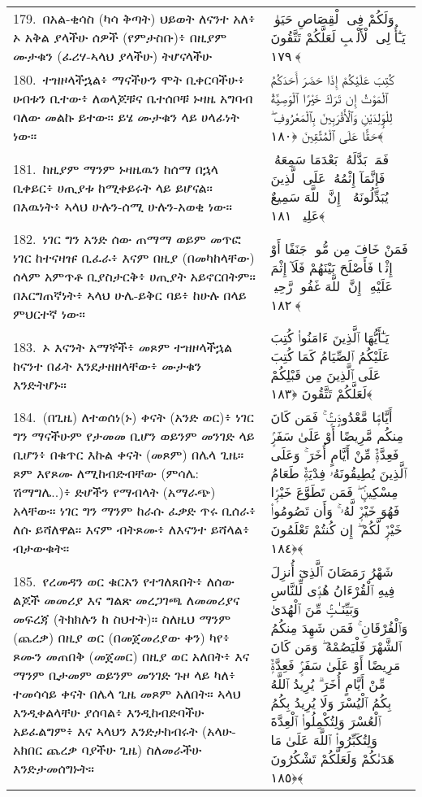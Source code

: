 \documentclass[11pt,a4paper,oneside]{article}%
\newcommand{\mytextarabic}[1]{\textarabic{ #1 \flushright}}
\begin{document}
\begin{longtable}{%
  @{}
    p{}
  @{~~~}
    p{}
    @{}
}
179.\ በአል-ቂሳስ (ካሳ ቅጣት) ህይወት ለናንተ አለ፥ ኦ አቅል ያላችሁ ሰዎች (የምታስቡ)፥ በዚያም ሙታቁን (ፈሪሃ-ኣላህ ያላችሁ) ትሆናላችሁ &  \mytextarabic{وَلَكُمْ فِى ٱلْقِصَاصِ حَيَوٰةٌۭ يَـٰٓأُو۟لِى ٱلْأَلْبَٟبِ لَعَلَّكُمْ تَتَّقُونَ ﴿١٧٩﴾}\\
180.\ ተዝዞላችኋል፥ ማናችሁን ሞት ቢቀርባችሁ፥ ሀብቱን ቢተው፥ ለወላጆቹና ቤተሰቦቹ ኑዛዜ አግባብ ባለው መልኩ ይተው። ይሄ ሙታቁን ላይ ሀላፊነት ነው። &  \mytextarabic{كُتِبَ عَلَيْكُمْ إِذَا حَضَرَ أَحَدَكُمُ ٱلْمَوْتُ إِن تَرَكَ خَيْرًا ٱلْوَصِيَّةُ لِلْوَٟلِدَيْنِ وَٱلْأَقْرَبِينَ بِٱلْمَعْرُوفِ ۖ حَقًّا عَلَى ٱلْمُتَّقِينَ ﴿١٨٠﴾}\\
181.\ ከዚያም ማንም ኑዛዜዉን ከሰማ በኋላ ቢቀይር፥ ሀጢያቱ ከሚቀይሩት ላይ ይሆናል። በእዉነት፥ ኣላህ ሁሉን-ሰሚ ሁሉን-አወቂ ነው። &  \mytextarabic{فَمَنۢ بَدَّلَهُۥ بَعْدَمَا سَمِعَهُۥ فَإِنَّمَآ إِثْمُهُۥ عَلَى ٱلَّذِينَ يُبَدِّلُونَهُۥٓ ۚ إِنَّ ٱللَّهَ سَمِيعٌ عَلِيمٌۭ ﴿١٨١﴾}\\
182.\ ነገር ግን አንድ ሰው ጠማማ ወይም መጥፎ ነገር ከተናዛዡ ቢፈራ፥ እናም በዚያ (በመካከላቸው) ሰላም አምጥቶ ቢያስታርቅ፥ ሀጢያት አይኖርበትም። በእርግጠኛነት፥ ኣላህ ሁሌ-ይቅር ባይ፥ ከሁሉ በላይ ምህርተኛ ነው። &  \mytextarabic{فَمَنْ خَافَ مِن مُّوصٍۢ جَنَفًا أَوْ إِثْمًۭا فَأَصْلَحَ بَيْنَهُمْ فَلَآ إِثْمَ عَلَيْهِ ۚ إِنَّ ٱللَّهَ غَفُورٌۭ رَّحِيمٌۭ ﴿١٨٢﴾}\\
183.\ ኦ እናንት አማኞች፥ መጾም ተዝዞላችኋል ከናንተ በፊት እንደታዘዘላቸው፥ ሙታቁን እንድትሆኑ። &  \mytextarabic{ يَـٰٓأَيُّهَا ٱلَّذِينَ ءَامَنُوا۟ كُتِبَ عَلَيْكُمُ ٱلصِّيَامُ كَمَا كُتِبَ عَلَى ٱلَّذِينَ مِن قَبْلِكُمْ لَعَلَّكُمْ تَتَّقُونَ ﴿١٨٣﴾}\\
184.\ (በጊዜ) ለተወሰነ(ኑ) ቀናት (አንድ ወር)፥ ነገር ግን ማናችሁም የታመመ ቢሆን ወይንም መንገድ ላይ ቢሆን፥ በቁጥር እኩል ቀናት (መጾም) በሌላ ጊዜ። ጾም እየጾሙ ለሚከብድብቸው (ምሳሌ: ሽማግሌ..)፥ ድሆችን የማብላት (አማራጭ) አላቸው። ነገር ግን ማንም ከራሱ ፈቃድ ጥሩ ቢሰራ፥ ለሱ ይሻለዋል። እናም ብትጾሙ፥ ለእናንተ ይሻላል፥ ብታውቁት።  &  \mytextarabic{أَيَّامًۭا مَّعْدُودَٟتٍۢ ۚ فَمَن كَانَ مِنكُم مَّرِيضًا أَوْ عَلَىٰ سَفَرٍۢ فَعِدَّةٌۭ مِّنْ أَيَّامٍ أُخَرَ ۚ وَعَلَى ٱلَّذِينَ يُطِيقُونَهُۥ فِدْيَةٌۭ طَعَامُ مِسْكِينٍۢ ۖ فَمَن تَطَوَّعَ خَيْرًۭا فَهُوَ خَيْرٌۭ لَّهُۥ ۚ وَأَن تَصُومُوا۟ خَيْرٌۭ لَّكُمْ ۖ إِن كُنتُمْ تَعْلَمُونَ ﴿١٨٤﴾}\\
185.\ የረመዳን ወር ቁርአን የተገለጸበት፥ ለሰው ልጆች መመሪያ እና ግልጽ መረጋገጫ ለመመሪያና መፍረጃ (ትክክሉን ከ ስህተት)። ስለዚህ ማንም (ጨረቃ) በዚያ ወር (በመጀመሪያው ቀን) ካየ፥ ጾሙን መጠበቅ (መጀመር) በዚያ ወር አለበት፥ እና ማንም ቢታመም ወይንም መንገድ ጉዞ ላይ ካለ፥ ተመሳሳይ ቀናት በሌላ ጊዜ መጾም አለበት። ኣላህ እንዲቀልላቸሁ ያሰባል፥ እንዲከብድባችሁ አይፈልግም፥ እና ኣላህን እንድታከብሩት (አላሁ-አክበር ጨረቃ ባያችሁ ጊዜ) ስለመራችሁ እንድታመሰግኑት።  &  \mytextarabic{شَهْرُ رَمَضَانَ ٱلَّذِىٓ أُنزِلَ فِيهِ ٱلْقُرْءَانُ هُدًۭى لِّلنَّاسِ وَبَيِّنَـٰتٍۢ مِّنَ ٱلْهُدَىٰ وَٱلْفُرْقَانِ ۚ فَمَن شَهِدَ مِنكُمُ ٱلشَّهْرَ فَلْيَصُمْهُ ۖ وَمَن كَانَ مَرِيضًا أَوْ عَلَىٰ سَفَرٍۢ فَعِدَّةٌۭ مِّنْ أَيَّامٍ أُخَرَ ۗ يُرِيدُ ٱللَّهُ بِكُمُ ٱلْيُسْرَ وَلَا يُرِيدُ بِكُمُ ٱلْعُسْرَ وَلِتُكْمِلُوا۟ ٱلْعِدَّةَ وَلِتُكَبِّرُوا۟ ٱللَّهَ عَلَىٰ مَا هَدَىٰكُمْ وَلَعَلَّكُمْ تَشْكُرُونَ ﴿١٨٥﴾}\\

\end{longtable}
\end{document}
